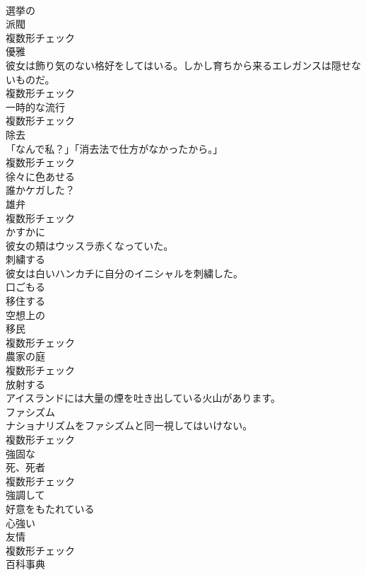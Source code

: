 \documentclass[8pt]{extreport}
\begin{document}
\begin{CJK}{UTF8}{min}
\\	[形容詞]	選挙の	
\\	[名詞]	派閥	
\\	複数形チェック
\\	[名詞]	優雅	
\\	彼女は飾り気のない格好をしてはいる。しかし育ちから来るエレガンスは隠せないものだ。	
\\	複数形チェック
\\	[名詞]	一時的な流行	
\\	複数形チェック
\\	[名詞]	除去	
\\	「なんで私？」「消去法で仕方がなかったから。」	
\\	複数形チェック
\\	[形容詞]	徐々に色あせる	
\\	誰かケガした？	
\\	[名詞]	雄弁	
\\	複数形チェック
\\	[副詞]	かすかに	
\\	彼女の頬はウッスラ赤くなっていた。	
\\	[動詞]	刺繍する	
\\	彼女は白いハンカチに自分のイニシャルを刺繍した。	
\\	[動詞]	口ごもる	
\\	[動詞]	移住する	
\\	[形容詞]	空想上の	
\\	[名詞]	移⺠	
\\	複数形チェック
\\	[名詞]	農家の庭	
\\	複数形チェック
\\	[動詞]	放射する	
\\	アイスランドには大量の煙を吐き出している火山があります。	
\\	[名詞]	ファシズム	
\\	ナショナリズムをファシズムと同一視してはいけない。	
\\	複数形チェック
\\	[形容詞]	強固な	
\\	[名詞]	死、死者	
\\	複数形チェック
\\	[副詞]	強調して	
\\	[形容詞]	好意をもたれている	
\\	[形容詞]	心強い	
\\	[名詞]	友情	
\\	複数形チェック
\\	[名詞]	百科事典	

\end{CJK}
\end{document}
